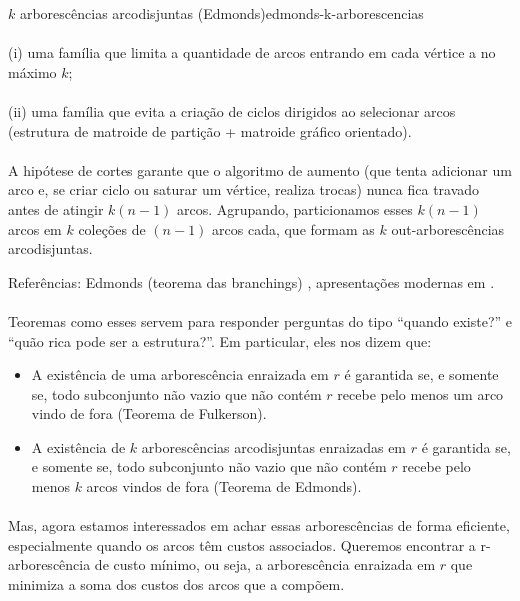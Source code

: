 \documentclass[12pt,a4paper]{article}
\def\emph#1{#1}%
\begin{document}
\begin{teobox}{$k$ arborescências arcodisjuntas (Edmonds)}{edmonds-k-arborescencias}
\paragraph{}
(i) uma família que limita a quantidade de arcos entrando em cada vértice a no máximo $k$; 

\paragraph{}
(ii) uma família que evita a criação de ciclos dirigidos ao selecionar arcos (estrutura de matroide de partição + matroide gráfico orientado). 

\paragraph{}
A hipótese de cortes garante que o algoritmo de aumento (que tenta adicionar um arco e, se criar ciclo ou saturar um vértice, realiza trocas) nunca fica travado antes de atingir $k(n-1)$ arcos. Agrupando, particionamos esses $k(n-1)$ arcos em $k$ coleções de $(n-1)$ arcos cada, que formam as $k$ out-arborescências arcodisjuntas.

\medskip
\emph{Referências:} Edmonds (teorema das branchings) \cite{edmonds1967optimum}, apresentações modernas em \cite{schrijver2003comb}.
\label{thm:edmonds-disjoint-arborescencias} 
\end{teobox}

\paragraph{}
Teoremas como esses servem para responder perguntas do tipo “quando existe?” e “quão rica pode ser a estrutura?”. Em particular, eles nos dizem que:
\begin{itemize}\setlength{\itemsep}{2pt}
    \item A existência de uma arborescência enraizada em \(r\) é garantida se, e somente se, todo subconjunto não vazio que não contém \(r\) recebe pelo menos um arco vindo de fora (Teorema de Fulkerson).
    \item A existência de \(k\) arborescências arcodisjuntas enraizadas em \(r\) é garantida se, e somente se, todo subconjunto não vazio que não contém \(r\) recebe pelo menos \(k\) arcos vindos de fora (Teorema de Edmonds).
\end{itemize}

\paragraph{}
Mas, agora estamos interessados em achar essas arborescências de forma eficiente, especialmente quando os arcos têm custos associados. Queremos encontrar a r-arborescência de custo mínimo, ou seja, a arborescência enraizada em \(r\) que minimiza a soma dos custos dos arcos que a compõem.
\end{document}
